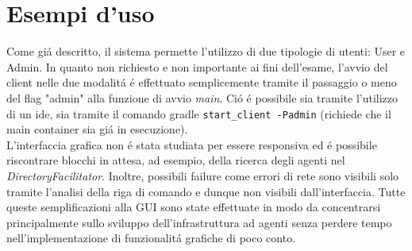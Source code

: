 \section{Esempi d’uso}


Come gi\'a descritto, il sistema permette l'utilizzo di due tipologie di utenti: User e Admin. In quanto non richiesto e non importante ai fini dell'esame, l'avvio del client nelle due modalit\'a \'e effettuato semplicemente tramite il passaggio o meno del flag "admin" alla funzione di avvio \textit{main}. Ci\'o \'e possibile sia tramite l'utilizzo di un ide, sia tramite il comando gradle \texttt{start\_client -Padmin} (richiede che il main container sia gi\'a in esecuzione).\\
L'interfaccia grafica non \'e stata studiata per essere responsiva ed \'e possibile riscontrare blocchi in attesa, ad esempio, della ricerca degli agenti nel \textit{DirectoryFacilitator}. Inoltre, possibili failure come errori di rete sono visibili solo tramite l'analisi della riga di comando e dunque non visibili dall'interfaccia. Tutte queste semplificazioni alla GUI sono state effettuate in modo da concentrarsi principalmente sullo sviluppo dell'infrastruttura ad agenti senza perdere tempo nell'implementazione di funzionalit\'a grafiche di poco conto.

